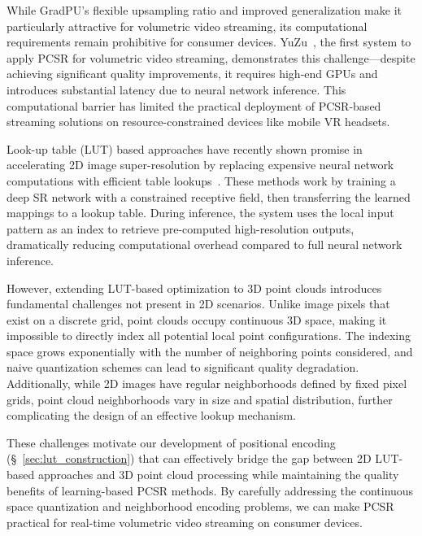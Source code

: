 While GradPU's flexible upsampling ratio and improved generalization make it particularly attractive for volumetric video streaming, its computational requirements remain prohibitive for consumer devices. YuZu~\cite{zhang_yuzu_nodate}, the first system to apply PCSR for volumetric video streaming, demonstrates this challenge—despite achieving significant quality improvements, it requires high-end GPUs and introduces substantial latency due to neural network inference. This computational barrier has limited the practical deployment of PCSR-based streaming solutions on resource-constrained devices like mobile VR headsets.

Look-up table (LUT) based approaches have recently shown promise in accelerating 2D image super-resolution by replacing expensive neural network computations with efficient table lookups~\cite{tang_lut-nn_2023,jo_practical_2021, liu4DLUTLearnable2022, yang_adaint_2022}. These methods work by training a deep SR network with a constrained receptive field, then transferring the learned mappings to a lookup table. During inference, the system uses the local input pattern as an index to retrieve pre-computed high-resolution outputs, dramatically reducing computational overhead compared to full neural network inference.

However, extending LUT-based optimization to 3D point clouds introduces fundamental challenges not present in 2D scenarios. Unlike image pixels that exist on a discrete grid, point clouds occupy continuous 3D space, making it impossible to directly index all potential local point configurations. The indexing space grows exponentially with the number of neighboring points considered, and naive quantization schemes can lead to significant quality degradation. Additionally, while 2D images have regular neighborhoods defined by fixed pixel grids, point cloud neighborhoods vary in size and spatial distribution, further complicating the design of an effective lookup mechanism.

These challenges motivate our development of positional encoding (\S~\ref{sec:lut_construction}) that can effectively bridge the gap between 2D LUT-based approaches and 3D point cloud processing while maintaining the quality benefits of learning-based PCSR methods. By carefully addressing the continuous space quantization and neighborhood encoding problems, we can make PCSR practical for real-time volumetric video streaming on consumer devices.
